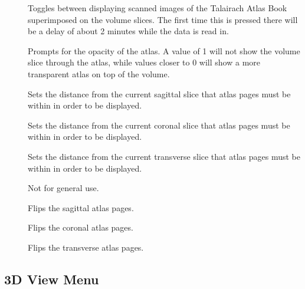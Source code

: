 \begin{description}
\item[]  Toggles between displaying scanned images
        of the Talairach Atlas Book superimposed on the volume slices.  The
        first time this is pressed there will be a delay of about 2 minutes
        while the data is read in.
\item[]  Prompts for the opacity of the atlas.
        A value of 1 will not show the volume slice through the atlas, while
        values closer to 0 will show a more transparent atlas on top of the
        volume.
\item[]  Sets the distance from the current
        sagittal slice that atlas pages must be within in order to be
        displayed.
\item[]  Sets the distance from the current
        coronal slice that atlas pages must be within in order to be
        displayed.
\item[]  Sets the distance from the current
        transverse slice that atlas pages must be within in order to be
        displayed.
\item[]  Not for general use.
\item[]  Flips the sagittal atlas pages.
\item[]  Flips the coronal atlas pages.
\item[]  Flips the transverse atlas pages.
\end{description}

\subsection{3D View Menu}

